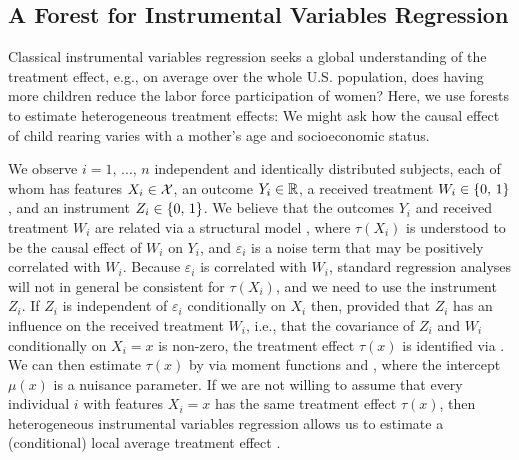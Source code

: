 \documentclass[aos]{imsart}
\theoremstyle{plain}
\theoremstyle{definition}
\theoremstyle{remark}
\begin{document}
\begin{CJK}{UTF8}{gbsn}
\subsection{A Forest for Instrumental Variables Regression}
\label{sec:iv_methods}

Classical instrumental variables regression seeks a global understanding of the treatment
effect, e.g., on average over the whole U.S. population, does having more children reduce the labor force participation
of women? Here, we use forests to estimate heterogeneous
treatment effects: We might ask how the causal effect of child rearing varies with a mother's age and
socioeconomic status.

We observe $i = 1, \, ..., \, n$ independent and identically distributed subjects,
each of whom has features $X_i \in \mathcal{X}$, an outcome $Y_i \in \mathbb{R}$, a received treatment $W_i \in \left\{0, \, 1\right\}$,
and an instrument $Z_i \in \left\{0, \, 1\right\}$. We believe that the outcomes $Y_i$ and received treatment $W_i$ are
related via a structural model
,
where $\tau(X_i)$ is understood to be the causal effect of $W_i$ on $Y_i$, and
$\varepsilon_i$ is a noise term that may be positively correlated with $W_i$. Because $\varepsilon_i$
is correlated with $W_i$, standard regression analyses will not in general be consistent for $\tau(X_i)$,
and we need to use the instrument $Z_i$. If $Z_i$ is independent of $\varepsilon_i$
conditionally on $X_i$ then, provided that $Z_i$ has an influence on the received treatment $W_i$, i.e., that
the covariance of $Z_i$ and $W_i$ conditionally on $X_i = x$ is non-zero, the treatment effect
$\tau(x)$ is identified via
.
We can then estimate $\tau(x)$ by via moment functions
 and
,
 where the intercept $\mu(x)$ is a nuisance parameter.
If we are not willing to assume that every individual $i$ with features
$X_i = x$ has the same treatment effect $\tau(x)$,
then heterogeneous instrumental variables regression
allows us to estimate a (conditional) local average treatment effect
\citep{abadie2003semiparametric,imbens1994identification}.
 

\end{CJK}
\end{document}
